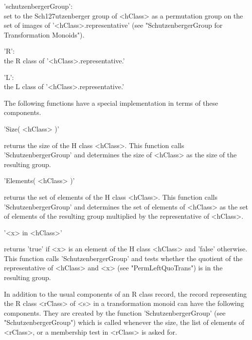 'schutzenbergerGroup':\\
        set to   the Sch\accent127utzenberger group     of <hClass> as  a
        permutation      group  on       the  set     of    images     of
        '<hClass>.representative'    (see   "SchutzenbergerGroup      for
        Transformation Monoids").

'R':\\
        the R class of '<hClass>.representative.'

'L':\\
        the L class of '<hClass>.representative.'
        
The  following functions have a  special implementation in terms of these
components.

\vspace{5mm}
'Size( <hClass> )'%

returns    the size  of  the   H  class  <hClass>.   This  function calls
'SchutzenbergerGroup' and determines the size of <hClass>  as the size of
the resulting group.

\vspace{5mm}
'Elements( <hClass> )'%

returns the set of elements of the H class <hClass>.  This function calls
'SchutzenbergerGroup' and  determines the set  of elements of <hClass> as
the  set   of  elements  of   the   resulting  group   multiplied by  the
representative of <hClass>.

\vspace{5mm}
'<x> in <hClass>'%
%

returns 'true' if  <x> is an element of  the H class <hClass> and 'false'
otherwise.   This function calls  'SchutzenbergerGroup' and tests whether
the  quotient   of the   representative   of    <hClass> and  <x>    (see
"PermLeftQuoTrans") is in the resulting group.


In addition to  the usual components of   an R class record,  the  record
representing the R class  <rClass> of <s>  in a transformation monoid can
have the  following  components.     They are created  by   the  function
'SchutzenbergerGroup'   (see  "SchutzenbergerGroup")    which is   called
whenever the size, the list of elements of <rClass>, or a membership test
in <rClass> is asked for.

